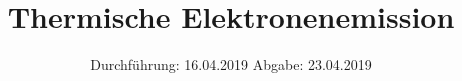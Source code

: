 

\subject{V504}
\title{Thermische Elektronenemission}
\date{
  Durchführung: 16.04.2019
  \hspace{3em}
  Abgabe: 23.04.2019
}


\maketitle
\thispagestyle{empty}
\tableofcontents
\newpage

%

%





\printbibliography

